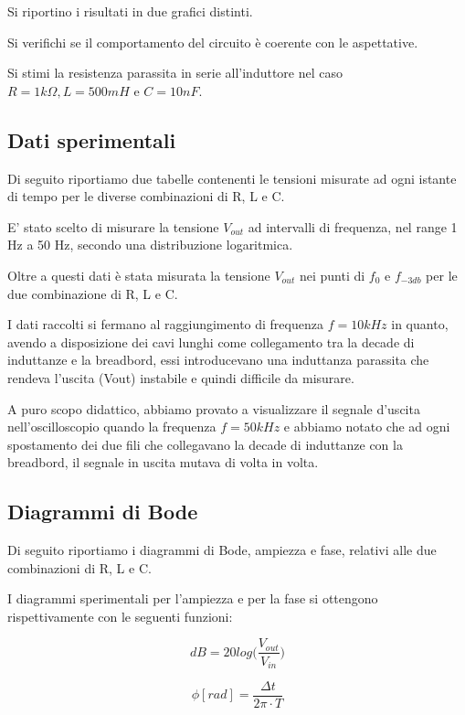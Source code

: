 \documentclass[a4paper,10pt]{article}
\begin{document}
Si riportino i risultati in due grafici distinti.

Si verifichi se il comportamento del circuito è coerente con le aspettative.

Si stimi la resistenza parassita in serie all'induttore nel caso $R = 1 k\Omega, L = 500 mH$ e $C = 10 nF$.

\subsection{Dati sperimentali}
Di seguito riportiamo due tabelle contenenti le tensioni misurate ad ogni istante di tempo per le diverse combinazioni di R, L e C.



E' stato scelto di misurare la tensione \textit{$V_{out}$} ad intervalli di frequenza, nel range 1 Hz a 50 Hz, secondo una distribuzione logaritmica.

Oltre a questi dati è stata misurata la tensione \textit{$V_{out}$} nei punti di $f_0$ e $f_{-3db}$ per le due combinazione di R, L e C. 

I dati raccolti si fermano al raggiungimento di frequenza $f = 10 kHz$ in quanto, avendo a disposizione dei cavi lunghi come collegamento tra la decade di induttanze e la breadbord, essi introducevano una induttanza parassita che rendeva l'uscita (Vout) instabile e quindi difficile da misurare.

A puro scopo didattico, abbiamo provato a visualizzare il segnale d'uscita nell'oscilloscopio quando la frequenza $f = 50 kHz$ e abbiamo notato che ad ogni spostamento dei due fili che collegavano la decade di induttanze con la breadbord, il segnale in uscita mutava di volta in volta.

\subsection{Diagrammi di Bode}
Di seguito riportiamo i diagrammi di Bode, ampiezza e fase, relativi alle due combinazioni di R, L e C.

\noindent
I diagrammi sperimentali per l’ampiezza e per la fase si ottengono rispettivamente con le seguenti funzioni:

\begin{minipage} [t]{0.45\textwidth}
    \begin{equation}
        dB = 20log \bigg ( \frac{V_{out}}{V_{in}} \bigg)
    \end{equation}
\end{minipage}
\hfill
 \begin{minipage} [t]{0.45\textwidth}
    \begin{equation}
        \phi[rad] = \frac{\Delta t}{2 \pi \cdot T} 
    \end{equation}
\end{minipage}
\end{document}
